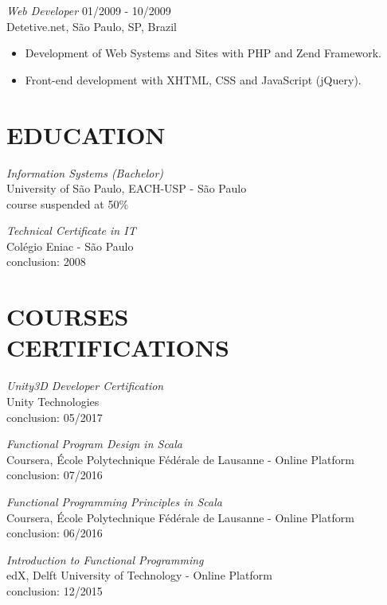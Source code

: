 \documentclass[line,margin]{res}
\begin{document}
\begin{resume}
                {\sl Web Developer} \hfill 01/2009 - 10/2009 \\
                Detetive.net, São Paulo, SP, Brazil
                 \begin{itemize}  \itemsep 1.25pt
                 \item Development of Web Systems and Sites with PHP and Zend Framework.
                 \item Front-end development with XHTML, CSS and JavaScript (jQuery).
                 \end{itemize} 

\section{EDUCATION} {\sl Information Systems (Bachelor)} \\
                University of São Paulo, EACH-USP - São Paulo \\
                course suspended at 50\%
		
			{\sl Technical Certificate in IT} \\
	                Colégio Eniac - São Paulo \\
	                conclusion: 2008
                
\section{COURSES \\ CERTIFICATIONS}   
           {\sl Unity3D Developer Certification} \\
			Unity Technologies \\
			conclusion: 05/2017
			
           {\sl Functional Program Design in Scala} \\
			Coursera, École Polytechnique Fédérale de Lausanne - Online Platform \\
			conclusion: 07/2016
			
           {\sl Functional Programming Principles in Scala} \\
			Coursera, École Polytechnique Fédérale de Lausanne - Online Platform \\
			conclusion: 06/2016
			
		   {\sl Introduction to Functional Programming} \\
			edX, Delft University of Technology - Online Platform \\
			conclusion: 12/2015


\end{resume}
\end{document}
